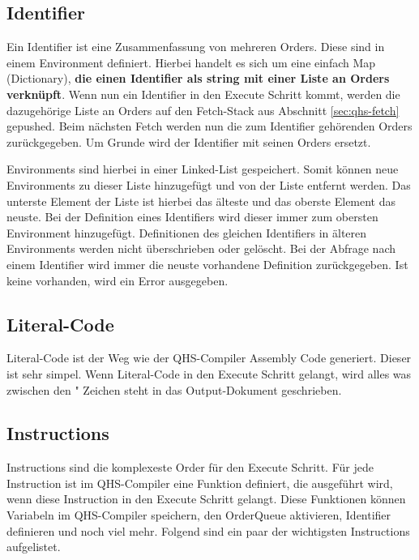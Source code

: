 \subsection{Identifier}
Ein Identifier ist eine Zusammenfassung von mehreren Orders. Diese sind in einem Environment definiert. Hierbei handelt es sich um eine einfach Map (Dictionary), \textbf{die einen Identifier als string mit einer Liste an Orders verknüpft}.
Wenn nun ein Identifier in den Execute Schritt kommt, werden die dazugehörige Liste an Orders auf den Fetch-Stack aus Abschnitt \ref{sec:qhs-fetch} gepushed.
Beim nächsten Fetch werden nun die zum Identifier gehörenden Orders zurückgegeben. Um Grunde wird der Identifier mit seinen Orders ersetzt.

Environments sind hierbei in einer Linked-List gespeichert. Somit können neue Environments zu dieser Liste hinzugefügt und von der Liste entfernt werden. Das unterste Element der Liste ist hierbei das älteste und das oberste Element das neuste.
Bei der Definition eines Identifiers wird dieser immer zum obersten Environment hinzugefügt. Definitionen des gleichen Identifiers in älteren Environments werden nicht überschrieben oder gelöscht.
Bei der Abfrage nach einem Identifier wird immer die neuste vorhandene Definition zurückgegeben. Ist keine vorhanden, wird ein Error ausgegeben.

\subsection{Literal-Code}
Literal-Code ist der Weg wie der QHS-Compiler Assembly Code generiert. Dieser ist sehr simpel. Wenn Literal-Code in den Execute Schritt gelangt, wird alles was zwischen den " Zeichen steht in das Output-Dokument geschrieben.

\subsection{Instructions}
Instructions sind die komplexeste Order für den Execute Schritt. Für jede Instruction ist im QHS-Compiler eine Funktion definiert, die ausgeführt wird, wenn diese Instruction in den Execute Schritt gelangt.
Diese Funktionen können Variabeln im QHS-Compiler speichern, den OrderQueue aktivieren, Identifier definieren und noch viel mehr. Folgend sind ein paar der wichtigsten Instructions aufgelistet.

